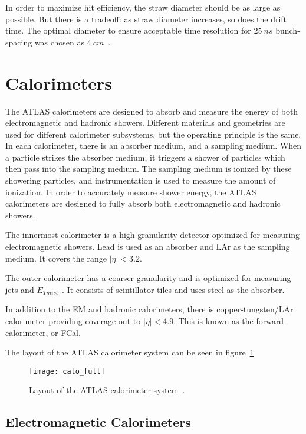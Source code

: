 In order to maximize hit efficiency, the straw diameter should be as large as possible.
But there is a tradeoff: as straw diameter increases, so does the drift time.
The optimal diameter to ensure acceptable time resolution for $25~ns$ bunch-spacing was chosen as $4~cm$~\cite{trt-2013}.

\section{Calorimeters}\label{sec:calorimeters}

The ATLAS calorimeters are designed to absorb and measure the energy of both electromagnetic and hadronic showers.
Different materials and geometries are used for different calorimeter subsystems, but the operating principle is the same.
In each calorimeter, there is an absorber medium, and a sampling medium.
When a particle strikes the absorber medium, it triggers a shower of particles which then pass into the sampling medium.
The sampling medium is ionized by these showering particles, and instrumentation is used to measure the amount of ionization.
In order to accurately measure shower energy, the ATLAS calorimeters are designed to fully absorb both electromagnetic and hadronic showers.

The innermost calorimeter is a high-granularity detector optimized for measuring electromagnetic showers.
Lead is used as an absorber and LAr as the sampling medium.
It covers the range $|\eta| < 3.2$.

The outer calorimeter has a coarser granularity and is optimized for measuring jets and $E_{T miss}$ .
It consists of scintillator tiles and uses steel as the absorber.

In addition to the EM and hadronic calorimeters, there is copper-tungsten/LAr calorimeter providing coverage out to
$|\eta| < 4.9$.
This is known as the forward calorimeter, or FCal.

The layout of the ATLAS calorimeter system can be seen in figure~\ref{fig:calo_full}

\begin{figure}[!ht]\centering
\texttt{[image: calo\_full]}
\caption{Layout of the ATLAS calorimeter system~\cite{atlas-detector-2008}.}
\label{fig:calo_full}
\end{figure}

\subsection{Electromagnetic Calorimeters}\label{subsec:em_cal}

